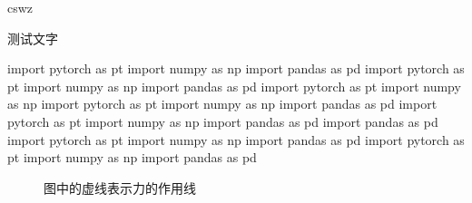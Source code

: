 \begin{Warning}
	\lipsum[2]
	\tcblower
	cswz
\end{Warning}



\begin{Comprehension}[测试文字\footnote{脚注}]
		\lipsum
	\begin{NumberedItem}
		\item 测试文字
	\end{NumberedItem}
\end{Comprehension}



\Remark{\zhlipsum[1]%
\tcblower%
\zhlipsum[2]}









\begin{PythonBox}[神经网络]
import pytorch as pt
import numpy as np
import pandas as pd
import pytorch as pt
import numpy as np
import pandas as pd
import pytorch as pt
import numpy as np
import pytorch as pt
import numpy as np
import pandas as pd
import pytorch as pt
import numpy as np
import pandas as pd
import pandas as pd
import pytorch as pt
import numpy as np
import pandas as pd
import pytorch as pt
import numpy as np
import pandas as pd
\end{PythonBox}













\Homework
\Basis
\zhlipsum[1]
\Complex
\zhlipsum[2]




\begin{figure}
	\centering
{}
\caption{图中的虚线表示力的作用线}
\end{figure}





